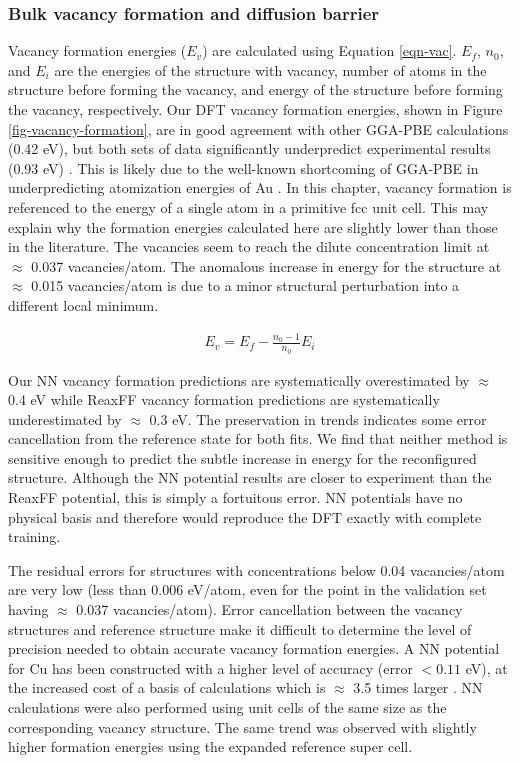 \documentclass[12pt]{cmuthesis}
\begin{document}
\subsubsection{Bulk vacancy formation and diffusion barrier}
\label{sec:orgf8a9170}
Vacancy formation energies (\(E_v\)) are calculated using Equation \ref{eqn-vac}. \(E_f\), \(n_0\), and \(E_i\) are the energies of the structure with vacancy, number of atoms in the structure before forming the vacancy, and energy of the structure before forming the vacancy, respectively. Our DFT vacancy formation energies, shown in Figure \ref{fig-vacancy-formation}, are in good agreement with other GGA-PBE calculations (0.42 eV), but both sets of data significantly underpredict experimental results (0.93 eV) \cite{xing-2014-vacan-format}. This is likely due to the well-known shortcoming of GGA-PBE in underpredicting atomization energies of Au \cite{schimka-2013-lattic-const}. In this chapter, vacancy formation is referenced to the energy of a single atom in a primitive fcc unit cell. This may explain why the formation energies calculated here are slightly lower than those in the literature. The vacancies seem to reach the dilute concentration limit at \(\approx\) 0.037 vacancies/atom. The anomalous increase in energy for the structure at \(\approx\) 0.015 vacancies/atom is due to a minor structural perturbation into a different local minimum.

\begin{eqnarray}
E_v = E_f - \frac{n_0 - 1}{n_0} E_i \label{eqn-vac}
\end{eqnarray}

Our NN vacancy formation predictions are systematically overestimated by \(\approx\) 0.4 eV while ReaxFF vacancy formation predictions are systematically underestimated by \(\approx\) 0.3 eV. The preservation in trends indicates some error cancellation from the reference state for both fits. We find that neither method is sensitive enough to predict the subtle increase in energy for the reconfigured structure. Although the NN potential results are closer to experiment than the ReaxFF potential, this is simply a fortuitous error.  NN potentials have no physical basis and therefore would reproduce the DFT exactly with complete training.

The residual errors for structures with concentrations below 0.04 vacancies/atom are very low (less than 0.006 eV/atom, even for the point in the validation set having \(\approx\) 0.037 vacancies/atom). Error cancellation between the vacancy structures and reference structure make it difficult to determine the level of precision needed to obtain accurate vacancy formation energies. A NN potential for Cu has been constructed with a higher level of accuracy (error \(< 0.11\) eV), at the increased cost of a basis of calculations which is \(\approx\) 3.5 times larger \cite{artrith-2012-high}. NN calculations were also performed using unit cells of the same size as the corresponding vacancy structure. The same trend was observed with slightly higher formation energies using the expanded reference super cell.
\end{document}
